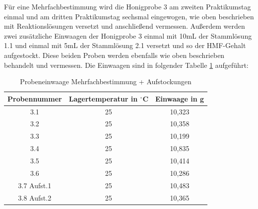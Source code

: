 Für eine Mehrfachbestimmung wird die Honigprobe 3 am zweiten Praktikumstag einmal und am dritten Praktikumstag sechsmal eingewogen, wie oben beschrieben mit Reaktionslösungen versetzt und anschließend vermessen. Außerdem werden zwei zusätzliche Einwaagen der Honigprobe 3 einmal mit 10mL der Stammlösung 1.1 und einmal mit 5mL der Stammlösung 2.1 versetzt und so der HMF-Gehalt aufgestockt. Diese beiden Proben werden ebenfalls wie oben beschrieben behandelt und vermessen. Die Einwaagen sind in folgender Tabelle \ref{tab:Probeneinwaage Mehrfachbestimmung + Aufstockungen} aufgeführt:
\begin{table}[htbp]
    \centering
    \caption{Probeneinwaage Mehrfachbestimmung + Aufstockungen}
        \begin{tabular}{c|c|c} 
            Probennummer & Lagertemperatur in $^\circ$C & Einwaage in g\\
            \hline
            3.1 & 25 & 10,323\\
            \hline
            3.2 & 25 & 10,358\\
            \hline
            3.3 & 25 & 10,199\\
            \hline
            3.4 & 25 & 10,835\\
            \hline
            3.5 & 25 & 10,414\\
            \hline
            3.6 & 25 & 10,286\\
            \hline
            3.7 Aufst.1 & 25 & 10,483\\
            \hline
            3.8 Aufst.2 & 25 & 10,365\\
        \end{tabular}
    \label{tab:Probeneinwaage Mehrfachbestimmung + Aufstockungen}
\end{table}
